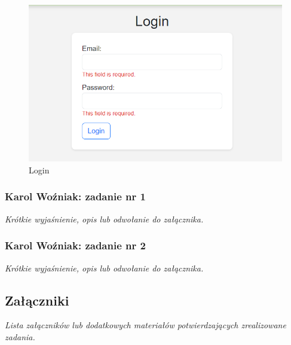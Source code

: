 \documentclass[12pt,a4paper,oneside]{article}
\theoremstyle{definition}
\numberwithin{equation}{section}
\begin{document}
\begin{figure}[H]
    \centering
    \includegraphics[width=0.8\columnwidth]{images/krzysztofBImages/register-login/login.png}
    \caption{Login}
    \label{login}
\end{figure}


\subsubsection{Karol Woźniak: zadanie nr 1}
\textit{Krótkie wyjaśnienie, opis lub odwołanie do załącznika.}
\subsubsection{Karol Woźniak: zadanie nr 2}
\textit{Krótkie wyjaśnienie, opis lub odwołanie do załącznika.}

\subsection{Załączniki}
\textit{Lista załączników lub dodatkowych materiałów potwierdzających zrealizowane zadania.}

%
%
%
\end{document}
